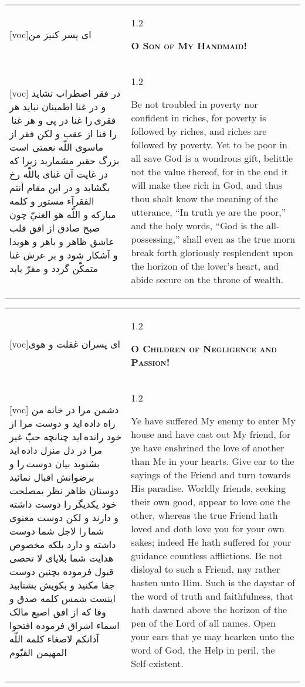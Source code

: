 \documentclass[11pt]{article}
\makeatletter
\newenvironment{orig}
  {\begin{farsi}[voc]}
  {\end{farsi}}
\newenvironment{trans}
  {\Large\begin{spacing}{1.2}\raggedright}
  {\end{spacing}}
\newenvironment{word}
  {\begin{tabular}[t]{p{2.75in}@{\hspace{3em}}p{2.75in}}}
  {\end{tabular}}
\newcommand{\ayat}[2]{\begin{orig}#1\end{orig} & \begin{trans}#2\end{trans}}
\newcommand{\heading}[2]{\textsc{\textbf{#1}} %
}
\makeatother
\begin{document}
\pagebreak

\begin{word}
\ayat{ای پسر کنيز من}{\heading{O Son of My Handmaid!}{}} \\ \ayat{
در فقر اضطراب نشايد و در غنا اطمينان نبايد
هر فقری را غنا در پی و هر غنا را فنا از عقب و لکن فقر از ماسوی اللّه نعمتی است بزرگ حقير مشماريد زيرا که در غايت آن غنای باللّه رخ بگشايد
و در اين مقام أنتم الفقرآء مستور و کلمه مبارکه و اللّه هو الغنيّ چون صبح صادق از افق قلب عاشق ظاهر و باهر و هويدا و آشکار شود و بر عرش غنا متمکّن گردد و مقرّ يابد
}{
  Be not troubled in poverty nor confident in riches, for poverty is followed
  by riches, and riches are followed by poverty. Yet to be poor in all save
  God is a wondrous gift, belittle not the value thereof, for in the end it
  will make thee rich in God, and thus thou shalt know the meaning of the
  utterance, ``In truth ye are the poor,'' and the holy words, ``God is the
  all-possessing,'' shall even as the true morn break forth gloriously
  resplendent upon the horizon of the lover's heart, and abide secure on the
  throne of wealth.
}
\end{word}

\pagebreak

\begin{word}
\ayat{ای پسران غفلت و هوی}{\heading{O Children of Negligence and Passion!}{}} \\ \ayat{
دشمن مرا در خانه من راه داده ايد و دوست مرا از خود رانده ايد چنانچه حبّ غير مرا در دل منزل داده ايد
بشنويد بيان دوست را و برضوانش اقبال نمائيد
دوستان ظاهر نظر بمصلحت خود يکديگر را دوست داشته و دارند و لکن دوست معنوی شما را لاجل شما دوست داشته و دارد بلکه مخصوص هدايت شما بلايای لا تحصی قبول فرموده
بچنين دوست جفا مکنيد و بکويش بشتابيد
اينست شمس کلمه صدق و وفا که از افق اصبع مالک اسماء اشراق فرموده
افتحوا آذانکم لاصغاء کلمة اللّه المهيمن القيّوم
}{
  Ye have suffered My enemy to enter My house and have cast out My friend, for
  ye have enshrined the love of another than Me in your hearts. Give ear to
  the sayings of the Friend and turn towards His paradise. Worldly friends,
  seeking their own good, appear to love one the other, whereas the true
  Friend hath loved and doth love you for your own sakes; indeed He hath
  suffered for your guidance countless afflictions. Be not disloyal to such a
  Friend, nay rather hasten unto Him. Such is the daystar of the word of truth
  and faithfulness, that hath dawned above the horizon of the pen of the Lord
  of all names. Open your ears that ye may hearken unto the word of God, the
  Help in peril, the Self-existent.
}
\end{word}
\end{document}
